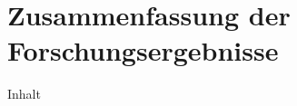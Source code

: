 \section{Zusammenfassung der Forschungsergebnisse}
\label{sec:07-01_summary-of-research-results}

Inhalt
